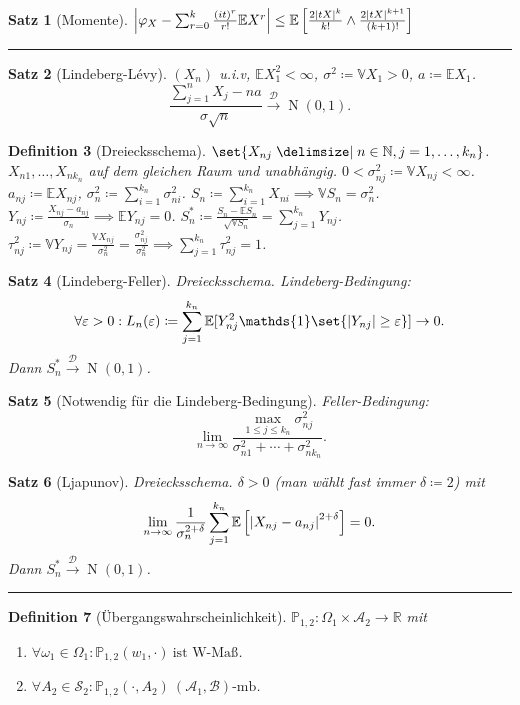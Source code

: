 \documentclass[a4paper,8pt]{article}
\newcounter{Sec}
\theoremstyle{nonumberbreak}
\newtheorem{definition}{Definition}[Sec]
\newtheorem{satz}[definition]{Satz}
\newcommand{\sep}{%
	\rule{\linewidth}{0.15pt}%
	\stepcounter{Sec}%
	}
\newcommand{\defas}{\coloneqq}
\DeclareMathOperator{\Nd}{N}
\newcommand{\ind}{\mathds{1}}
\renewcommand{\P}{\mathbb{P}}
\newcommand{\R}{\mathbb{R}}
\newcommand{\E}{\mathbb{E}}
\newcommand{\V}{\mathbb{V}}
\newcommand{\N}{\mathbb{N}}
\newcommand{\cf}{\varphi}
\newcommand{\vk}{\mathrel{\stackrel{\mathcal{D}}{\longrightarrow}}}
\begin{document}
\begin{multicols}{3}
\begin{satz}[Momente]
		$\abs{\cf_X - \sum_{r=0}^k{\frac{(it)^r}{r!}\E X^r}} \le \E\left[ \frac{2\abs{tX}^k}{k!} \land \frac{2\abs{tX}^{k+1}}{(k+1)!} \right]$
	\end{satz}
	\sep
	\begin{satz}[Lindeberg-Lévy]
		$(X_n)$ u.i.v, $\E X_1^2<\infty$, $\sigma^2\defas \V X_1>0$, $a\defas \E X_1$.
		\[
			\frac{\sum_{j=1}^nX_j - na}{\sigma\sqrt{n}}\vk \Nd(0, 1).
		\]
	\end{satz}
	\begin{definition}[Dreiecksschema]
		$\set{X_{nj}\given n\in\N, j=1,\ldots,k_n}$. $X_{n1},\ldots,X_{nk_n}$ auf dem
		gleichen Raum und unabhängig. $0<\sigma_{nj}^2\defas \V X_{nj}<\infty$.
		$a_{nj}\defas \E X_{nj}$, $\sigma_n^2\defas\sum_{i=1}^{k_n}\sigma_{ni}^2$.
		$S_n\defas\sum_{i=1}^{k_n}X_{ni}\implies \V S_n=\sigma_n^2$.
		$Y_{nj}\defas\frac{X_{nj}-a_{nj}}{\sigma_n}\implies \E Y_{nj}=0$.
		$S_n^*\defas\frac{S_n-\E S_n}{\sqrt{\V S_n}} = \sum_{j=1}^{k_n} Y_{nj}$.
		$\tau_{nj}^2\defas \V Y_{nj} = \frac{\V X_{nj}}{\sigma_n^2}=\frac{\sigma_{nj}^2}{\sigma_n^2}
		\implies \sum_{j=1}^{k_n}\tau_{nj}^2=1$.
	\end{definition}
	\begin{satz}[Lindeberg-Feller]
		Dreiecksschema. Lindeberg-Bedingung:
		\[
			\forall \varepsilon>0:L_n(\varepsilon)\defas \sum_{j=1}^{k_n}\E[Y_{nj}^2\ind\set{\abs{Y_{nj}}\geq\varepsilon}]\to 0.
		\]
		Dann $S_n^*\vk\Nd(0, 1)$.
	\end{satz}
	\begin{satz}[Notwendig für die Lindeberg-Bedingung]
		Feller-Bedingung:
		\[
			\lim_{n\to\infty}\frac{\max_{1\leq j\leq k_n}\sigma_{nj}^2}{\sigma_{n1}^2+\cdots+\sigma_{nk_n}^2}.
		\]
	\end{satz}
	\begin{satz}[Ljapunov]
		Dreiecksschema. $\delta>0$ (man wählt fast immer $\delta\defas 2$) mit
		\[
			\lim_{n\to\infty}\frac{1}{\sigma_n^{2+\delta}}\sum_{j=1}^{k_n}\E\left[\abs{X_{nj}-a_{nj}}^{2+\delta}\right]=0.
		\]
		Dann $S_n^*\vk\Nd(0, 1)$.
	\end{satz}
	\sep
	\begin{definition}[Übergangswahrscheinlichkeit]
		$\P_{1, 2}\colon\Omega_1\times\mathcal{A}_2\to\R$ mit
		\begin{enumerate}[label=(\alph*)]
			\item $\forall \omega_1\in\Omega_1:\P_{1,2}(w_1,\cdot)~\text{ist W-Maß}$.
			\item $\forall A_2\in\mathcal{S}_2:\P_{1,2}(\cdot,A_2)~\text{$(\mathcal{A}_1,\mathcal{B})$-mb}$.

\end{enumerate}
\end{definition}
\end{multicols}
\end{document}
